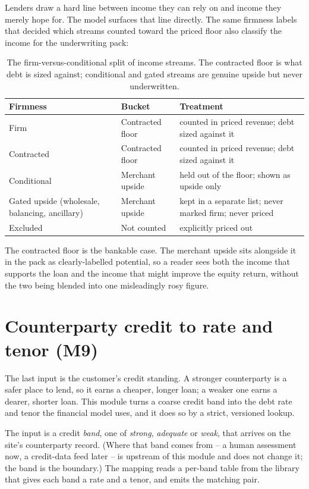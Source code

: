 Lenders draw a hard line between income they can rely on and income they merely hope for. The model surfaces that line directly. The same firmness labels that decided which streams counted toward the priced floor also classify the income for the underwriting pack:

\begin{table}[H]
\centering
\caption{The firm-versus-conditional split of income streams. The contracted floor is what debt is sized against; conditional and gated streams are genuine upside but never underwritten.}
\label{tab:split}
\small\sffamily
\begin{tabularx}{\textwidth}{@{}l l L@{}}
\toprule
\textbf{Firmness} & \textbf{Bucket} & \textbf{Treatment} \\
\midrule
Firm & Contracted floor & counted in priced revenue; debt sized against it \\
Contracted & Contracted floor & counted in priced revenue; debt sized against it \\
Conditional & Merchant upside & held out of the floor; shown as upside only \\
Gated upside (wholesale, balancing, ancillary) & Merchant upside & kept in a separate list; never marked firm; never priced \\
Excluded & Not counted & explicitly priced out \\
\bottomrule
\end{tabularx}
\end{table}

The contracted floor is the bankable case. The merchant upside sits alongside it in the pack as clearly-labelled potential, so a reader sees both the income that supports the loan and the income that might improve the equity return, without the two being blended into one misleadingly rosy figure.

\section{Counterparty credit to rate and tenor (M9)}

The last input is the customer's credit standing. A stronger counterparty is a safer place to lend, so it earns a cheaper, longer loan; a weaker one earns a dearer, shorter loan. This module turns a coarse credit band into the debt rate and tenor the financial model uses, and it does so by a strict, versioned lookup.

The input is a credit \emph{band}, one of \emph{strong}, \emph{adequate} or \emph{weak}, that arrives on the site's counterparty record. (Where that band comes from -- a human assessment now, a credit-data feed later -- is upstream of this module and does not change it; the band is the boundary.) The mapping reads a per-band table from the library that gives each band a rate and a tenor, and emits the matching pair.

